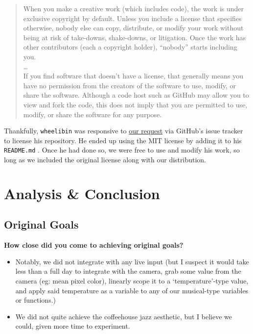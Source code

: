 \documentclass[12pt,a4paper]{article}
\newcommand{\code}{\texttt}
\begin{document}
\begin{quote}
When you make a creative work (which includes code), the work is under exclusive copyright by default. Unless you include a license that specifies otherwise, nobody else can copy, distribute, or modify your work without being at risk of take-downs, shake-downs, or litigation. Once the work has other contributors (each a copyright holder), “nobody” starts including you. \\
\dots \\
If you find software that doesn’t have a license, that generally means you have no permission from the creators of the software to use, modify, or share the software. Although a code host such as GitHub may allow you to view and fork the code, this does not imply that you are permitted to use, modify, or share the software for any purpose. \cite{choose-license-none}
\end{quote}


Thankfully, \code{wheelibin} was responsive to \href{https://github.com/wheelibin/synaesthesia/issues/2}{our request} via GitHub's issue tracker to license his repository. He ended up using the MIT license by adding it to his \code{README.md} \cite{synaesthesia-license}. Once he had done so, we were free to use and modify his work, so long as we included the original license along with our distribution.


\pagebreak
\section{Analysis \& Conclusion}
\subsection{Original Goals}
\textbf{How close did you come to achieving original goals?}
\begin{itemize}
	\item Notably, we did not integrate with any live input (but I suspect it would take less than a full day to integrate with the camera, grab some value from the camera (eg: mean pixel color), linearly scope it to a `temperature'-type value, and apply said temperature as a variable to any of our musical-type variables or functions.)
	\item We did not quite achieve the coffeehouse jazz aesthetic, but I believe we could, given more time to experiment.
\end{itemize}
\end{document}
